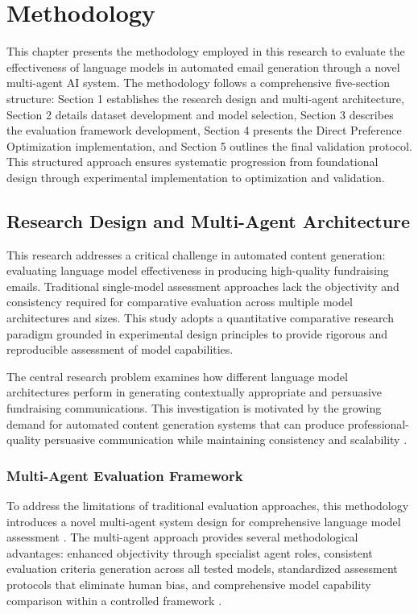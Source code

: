 \chapter{Methodology}

This chapter presents the methodology employed in this research to evaluate the effectiveness of language models in automated email generation through a novel multi-agent AI system. The methodology follows a comprehensive five-section structure: Section 1 establishes the research design and multi-agent architecture, Section 2 details dataset development and model selection, Section 3 describes the evaluation framework development, Section 4 presents the Direct Preference Optimization implementation, and Section 5 outlines the final validation protocol. This structured approach ensures systematic progression from foundational design through experimental implementation to optimization and validation.

\section{Research Design and Multi-Agent Architecture}
\label{sec:research-design-architecture}

This research addresses a critical challenge in automated content generation: evaluating language model effectiveness in producing high-quality fundraising emails. Traditional single-model assessment approaches lack the objectivity and consistency required for comparative evaluation across multiple model architectures and sizes. This study adopts a quantitative comparative research paradigm grounded in experimental design principles to provide rigorous and reproducible assessment of model capabilities.

The central research problem examines how different language model architectures perform in generating contextually appropriate and persuasive fundraising communications. This investigation is motivated by the growing demand for automated content generation systems that can produce professional-quality persuasive communication while maintaining consistency and scalability \cite{murakami2023nlg_advertising, zheng2023click_controllable}.

\subsection{Multi-Agent Evaluation Framework}

To address the limitations of traditional evaluation approaches, this methodology introduces a novel multi-agent system design for comprehensive language model assessment \cite{guo2024llm_multiagent, yan2025beyond_selftalk}. The multi-agent approach provides several methodological advantages: enhanced objectivity through specialist agent roles, consistent evaluation criteria generation across all tested models, standardized assessment protocols that eliminate human bias, and comprehensive model capability comparison within a controlled framework \cite{yehudai2025survey_llm_agents, ma2024agentboard}.

